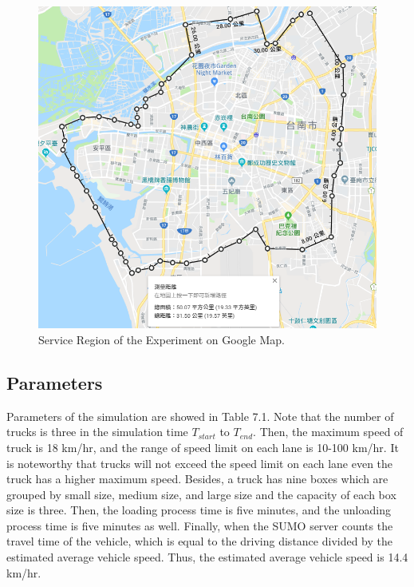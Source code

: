 \documentclass[12pt]{ksthesis}
\begin{document}
\begin{thesis}
{\begin{figure}[H]
\centering
\includegraphics[width=1.0\textwidth]{./Thesis_figures/F7-3_GoogleMap.PNG}
\caption{\large Service Region of the Experiment on Google Map.}
\vspace{0.5cm}
\label{Fig:GoogleMap}
\end{figure}

\subsection{Parameters}
Parameters of the simulation are showed in Table 7.1. Note that the number of trucks is three in the simulation time $T_{start}$ to $T_{end}$. 
Then, the maximum speed of truck is 18 km/hr, and the range of speed limit on each lane is 10-100 km/hr. It is noteworthy that trucks will not exceed the speed limit on each lane even the truck has a higher maximum speed. Besides, a truck has nine boxes which are grouped by small size, medium size, and large size and the capacity of each box size is three. Then, the loading process time is five minutes, and the unloading process time is five minutes as well. Finally, when the SUMO server counts the travel time of the vehicle, which is equal to the driving distance divided by the estimated average vehicle speed. Thus, the estimated average vehicle speed is 14.4 km/hr.

}
\end{thesis}
\end{document}
